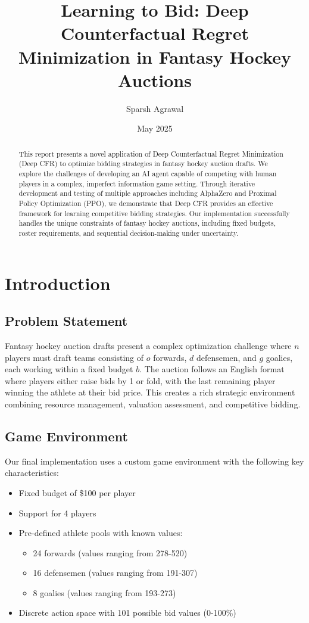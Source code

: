 \documentclass[11pt]{article}
\title{Learning to Bid: Deep Counterfactual Regret Minimization in Fantasy Hockey Auctions}
\author{Sparsh Agrawal}
\date{May 2025}
\begin{document}
\maketitle

\begin{abstract}
This report presents a novel application of Deep Counterfactual Regret Minimization (Deep CFR) to optimize bidding strategies in fantasy hockey auction drafts. We explore the challenges of developing an AI agent capable of competing with human players in a complex, imperfect information game setting. Through iterative development and testing of multiple approaches including AlphaZero and Proximal Policy Optimization (PPO), we demonstrate that Deep CFR provides an effective framework for learning competitive bidding strategies. Our implementation successfully handles the unique constraints of fantasy hockey auctions, including fixed budgets, roster requirements, and sequential decision-making under uncertainty.
\end{abstract}

\section{Introduction}
\subsection{Problem Statement}
Fantasy hockey auction drafts present a complex optimization challenge where $n$ players must draft teams consisting of $o$ forwards, $d$ defensemen, and $g$ goalies, each working within a fixed budget $b$. The auction follows an English format where players either raise bids by 1 or fold, with the last remaining player winning the athlete at their bid price. This creates a rich strategic environment combining resource management, valuation assessment, and competitive bidding.

\subsection{Game Environment}
Our final implementation uses a custom game environment with the following key characteristics:
\begin{itemize}
    \item Fixed budget of \$100 per player
    \item Support for 4 players
    \item Pre-defined athlete pools with known values:
        \begin{itemize}
            \item 24 forwards (values ranging from 278-520)
            \item 16 defensemen (values ranging from 191-307)
            \item 8 goalies (values ranging from 193-273)
        \end{itemize}
    \item Discrete action space with 101 possible bid values (0-100\%)
\end{itemize}
\end{document}
